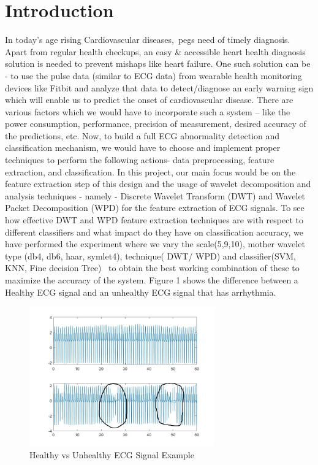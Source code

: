 \documentclass[10pt,twocolumn,letterpaper]{article}
\begin{document}
\section{Introduction}
\label{sec:intro}
In today’s age rising Cardiovascular diseases, pegs need of timely diagnosis. Apart from regular health checkups, an easy \& accessible heart health diagnosis solution is needed to prevent mishaps like heart failure. One such solution can be - to use the pulse data (similar to ECG data) from wearable health monitoring devices like Fitbit and analyze that data to detect/diagnose an early warning sign which will enable us to predict the onset of cardiovascular disease. There are various factors which we would have to incorporate such a system – like the power consumption, performance, precision of measurement, desired accuracy of the predictions, etc.
Now, to build a full ECG abnormality detection and classification mechanism, we would have to choose and implement proper techniques to perform the following actions- data preprocessing, feature extraction, and classification. In this project, our main focus would be on the feature extraction step of this design and the usage of wavelet decomposition and analysis techniques - namely - Discrete Wavelet Transform (DWT) and Wavelet Packet Decomposition (WPD) for the feature extraction of ECG signals.
To see how effective DWT and WPD feature extraction techniques are with respect to different classifiers and what impact do they have on classification accuracy, we have performed the experiment where we vary the scale(5,9,10), mother wavelet type (db4, db6, haar, symlet4), technique( DWT/ WPD) and classifier(SVM, KNN, Fine decision Tree)  to obtain the best working combination of these to maximize the accuracy of the system.
Figure 1 shows the difference between a Healthy ECG signal and an unhealthy ECG signal that has arrhythmia.
\begin{figure}[h!]
\includegraphics[width=8cm]{healthyVSunhealthy.JPG}
\caption{Healthy vs Unhealthy  ECG Signal Example}
\label{Comparison}
\end{figure}
\end{document}
